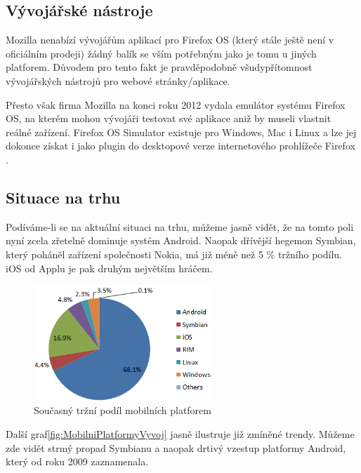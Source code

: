 \subsection{Vývojářské nástroje}
Mozilla nenabízí vývojářům aplikací pro Firefox OS (který stále ještě není v oficiálním prodeji) žádný balík se vším potřebným jako je tomu u jiných platforem. Důvodem pro tento fakt je pravděpodobně všudypřítomnost vývojářských nástrojů pro webové stránky/aplikace.

Přesto však firma Mozilla na konci roku 2012 vydala emulátor systému Firefox OS, na kterém mohou vývojáři testovat své aplikace aniž by museli vlastnit reálné zařízení. Firefox OS Simulator existuje pro Windows, Mac i Linux a lze jej dokonce získat i jako plugin do desktopové verze internetového prohlížeče Firefox \cite{announcing_fxOS_simulator}.

\subsection{Situace na trhu}
Podíváme-li se na aktuální situaci na trhu, můžeme jasně vidět, že na tomto poli nyní zcela zřetelně dominuje systém Android. Naopak dřívější hegemon Symbian, který poháněl zařízení společnosti Nokia, má již méně než 5 \% tržního podílu. iOS od Applu je pak druhým největším hráčem.

\begin{figure}\centering
\includegraphics[width=0.6\textwidth]{smartphone_by_platform.png}
\caption{Současný tržní podíl mobilních platforem}
\label{fig:MobilniPlatformyPodil}
\end{figure}

Další graf\ref{fig:MobilniPlatformyVyvoj} jasně ilustruje již zmíněné trendy. Můžeme zde vidět strmý propad Symbianu a naopak drtivý vzestup platformy Android, který od roku 2009 zaznamenala. 

